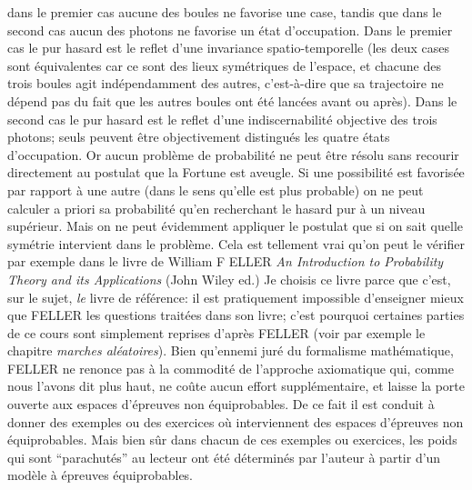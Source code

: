 {dans le premier cas aucune des boules ne favorise une case, tandis que 
dans le second cas aucun des photons ne favorise un \'etat d'occupation. 
Dans le premier cas le pur hasard est le reflet d'une invariance 
spatio-temporelle (les deux cases sont \'equivalentes car ce sont des 
lieux sym\'etriques de l'espace, et chacune des trois boules agit 
ind\'ependamment des autres, c'est-\`a-dire que sa trajectoire ne 
d\'epend pas du fait que les autres boules ont \'et\'e lanc\'ees avant ou 
apr\`es). Dans le second cas le pur hasard est le reflet d'une 
indiscernabilit\'e objective des trois photons; seuls peuvent \^etre 
objectivement distingu\'es les quatre \'etats d'occupation.   
\medskip  
Or aucun probl\`eme de probabilit\'e ne peut \^etre r\'esolu sans 
recourir directement au postulat que la Fortune est aveugle. Si une 
possibilit\'e est favoris\'ee par rapport \`a une autre (dans le sens 
qu'elle est plus probable) on ne peut calculer a priori sa probabilit\'e 
qu'en recherchant le hasard pur \`a un niveau sup\'erieur. Mais on ne 
peut \'evidemment appliquer le  postulat que si on sait quelle 
sym\'etrie intervient dans le probl\`eme. Cela est tellement vrai qu'on 
peut le v\'erifier par exemple dans le livre  de William F{\eightrm 
ELLER} {\it An Introduction to Probability Theory  and its Applications} 
(John Wiley ed.) Je choisis ce livre parce que c'est, sur le sujet, {\it le} 
livre de r\'ef\'erence: il est pratiquement impossible d'enseigner mieux 
que F{\eightrm ELLER} les questions trait\'ees dans son livre; c'est 
pourquoi certaines parties de ce cours sont simplement reprises 
d'apr\`es F{\eightrm ELLER} (voir par exemple le chapitre {\it marches 
al\'eatoires}). Bien qu'ennemi jur\'e du formalisme  math\'ematique, 
F{\eightrm ELLER} ne renonce pas \`a la commodit\'e de l'approche 
axiomatique qui, comme nous l'avons dit plus haut, ne co\^ute aucun 
effort suppl\'ementaire, et laisse la porte ouverte aux espaces 
d'\'epreuves non \'equiprobables. De ce fait il est conduit \`a donner des 
exemples ou des exercices o\`u interviennent des espaces d'\'epreuves 
non \'equiprobables. Mais bien s\^ur dans chacun de ces exemples ou 
exercices, les poids qui sont ``parachut\'es'' au lecteur ont \'et\'e 
d\'etermin\'es par l'auteur \`a partir d'un mod\`ele \`a \'epreuves 
\'equiprobables.   
\medskip  

}
